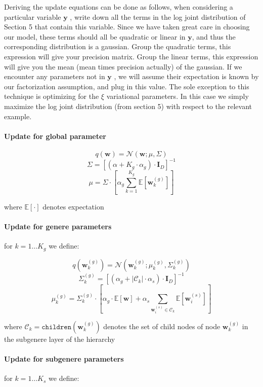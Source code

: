 \documentclass[11pt, a4paper]{article}
\begin{document}
Deriving the update equations can be done as follows, when considering a particular variable $\textbf{y}$ , write down all the terms in the log joint distribution of Section 5 that contain this variable. Since we have taken great care in choosing our model, these terms should all be quadratic or linear in $\textbf{y}$, and thus the corresponding distribution is a gaussian. Group the quadratic terms, this expression will give your precision matrix. Group the linear terms, this expression will give you the mean (mean times precision actually) of the gaussian.
If we encounter any parameters not in  $\textbf{y}$ , we will assume their expectation is known by our factorization assumption, and plug in this value.
The sole exception to this technique is optimizing for the $\xi$ variational parameters. In this case we simply maximize the log joint distribution (from section 5) with respect to the relevant example.

\paragraph{Update for global parameter}
$$q(\textbf{w})=\mathcal{N}\left(\textbf{w}; \mu, \Sigma \right)$$
$$\Sigma=\left[\left(\alpha+K_g\cdot\alpha_g\right)\cdot  \textbf{I}_D \right]^{-1}$$
$$\mu=\Sigma\cdot\left[\alpha_g\sum_{k=1}^{K_g}\mathbb{E}\left[\textbf{w}^{(g)}_{k}\right] \right]$$

\noindent where $\mathbb{E}\left[\cdot\right]$ denotes expectation

\paragraph{Update for genere parameters}
\noindent for $k=1\dots K_g$ we define:

$$q(\textbf{w}^{(g)}_{k})=\mathcal{N}\left(\textbf{w}^{(g)}_{k}; \mu^{(g)}_k, \Sigma^{(g)}_k \right)$$
$$\Sigma^{(g)}_k =\left[\left(\alpha_g+|\mathcal{C}_k|\cdot\alpha_s\right)\cdot  \textbf{I}_D \right]^{-1}$$
$$\mu^{(g)}_k=\Sigma^{(g)}_k \cdot\left[\alpha_g\cdot \mathbb{E}\left[\textbf{w}\right]+\alpha_s\sum_{\textbf{w}^{(s)}_{i}\in \mathcal{C}_k}\mathbb{E}\left[\textbf{w}^{(s)}_{i}\right] \right]$$

\noindent where $\mathcal{C}_k=\texttt{children}\left(\textbf{w}^{(g)}_{k}\right)$ denotes the set of child nodes of node $\textbf{w}^{(g)}_{k}$ in the subgenere layer of the hierarchy

\paragraph{Update for subgenere parameters}
\noindent for $k=1\dots K_s$ we define:
\end{document}
